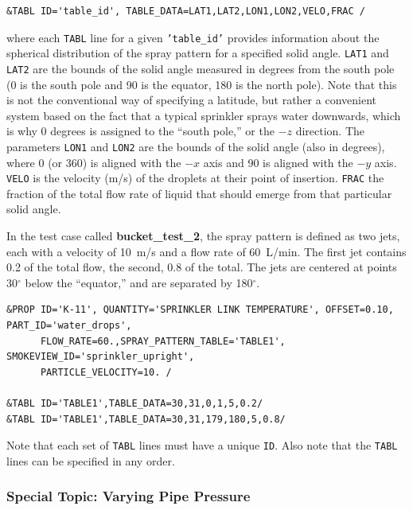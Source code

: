 \documentclass[11pt]{book}
\newcommand{\ct}{\tt\small}
\begin{document}
\footnotesize
\begin{verbatim}
&TABL ID='table_id', TABLE_DATA=LAT1,LAT2,LON1,LON2,VELO,FRAC /
\end{verbatim} \normalsize

\noindent
where each {\ct TABL} line for a given {\ct 'table\_id'} provides information about the spherical distribution of the spray pattern
for a specified solid angle. {\ct LAT1} and {\ct LAT2} are the bounds of the solid angle measured in degrees from
the south pole (0 is the south pole and 90 is the equator, 180 is the north pole).  Note that this is not the conventional way of
specifying a latitude, but rather a convenient system based on the fact that a typical sprinkler sprays water downwards, which is
why 0 degrees is assigned to the ``south pole,'' or the $-z$ direction. The parameters {\ct LON1} and {\ct LON2} are the
bounds of the solid angle (also in degrees),
where 0 (or 360) is aligned with the $-x$ axis and 90 is aligned with the $-y$ axis.  {\ct VELO} is the velocity (m/s) of the droplets at their
point of insertion.
{\ct FRAC} the fraction of the total flow rate of liquid that should emerge from that particular solid angle.

In the test case called {\bf bucket\_test\_2}, the spray pattern is defined as two jets, each with a velocity of 10~m/s and a flow rate
of 60~L/min. The first jet contains 0.2 of the total flow, the second, 0.8 of the total.
The jets are centered at points 30$^\circ$ below the ``equator,'' and are separated by 180$^\circ$.

\footnotesize
\begin{verbatim}
&PROP ID='K-11', QUANTITY='SPRINKLER LINK TEMPERATURE', OFFSET=0.10, PART_ID='water_drops',
      FLOW_RATE=60.,SPRAY_PATTERN_TABLE='TABLE1', SMOKEVIEW_ID='sprinkler_upright',
      PARTICLE_VELOCITY=10. /

&TABL ID='TABLE1',TABLE_DATA=30,31,0,1,5,0.2/
&TABL ID='TABLE1',TABLE_DATA=30,31,179,180,5,0.8/
\end{verbatim}
\normalsize


\begin{warning}
\noindent
Note that each set of {\ct TABL} lines must have a unique {\ct ID}.  Also note that
the {\ct TABL} lines can be specified in any order.
\end{warning}




\subsubsection{Special Topic: Varying Pipe Pressure}
\label{info:pressureramp}
\end{document}
